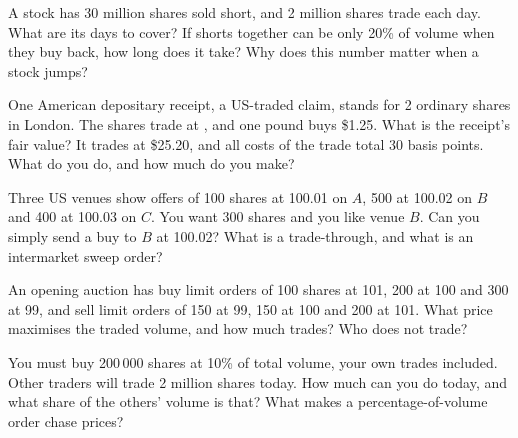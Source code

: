 \begin{question}\label{iq:iv2:markets-and-microstructure:9}
A stock has 30 million shares sold short, and 2 million shares trade each day. What are its days to cover? If shorts together can be only 20\% of volume when they buy back, how long does it take? Why does this number matter when a stock jumps?
\end{question}

\begin{question}\label{iq:iv2:markets-and-microstructure:10}
One American depositary receipt, a US-traded claim, stands for 2 ordinary shares in London. The shares trade at , and one pound buys \$1.25. What is the receipt's fair value? It trades at \$25.20, and all costs of the trade total 30 basis points. What do you do, and how much do you make?
\end{question}

\begin{question}\label{iq:iv2:markets-and-microstructure:11}
Three US venues show offers of 100 shares at 100.01 on $A$, 500 at 100.02 on $B$ and 400 at 100.03 on $C$. You want 300 shares and you like venue $B$. Can you simply send a buy to $B$ at 100.02? What is a trade-through, and what is an intermarket sweep order?
\end{question}

\begin{question}\label{iq:iv2:markets-and-microstructure:12}
An opening auction has buy limit orders of 100 shares at 101, 200 at 100 and 300 at 99, and sell limit orders of 150 at 99, 150 at 100 and 200 at 101. What price maximises the traded volume, and how much trades? Who does not trade?
\end{question}

\begin{question}\label{iq:iv2:markets-and-microstructure:13}
You must buy 200\,000 shares at 10\% of total volume, your own trades included. Other traders will trade 2 million shares today. How much can you do today, and what share of the others' volume is that? What makes a percentage-of-volume order chase prices?
\end{question}

